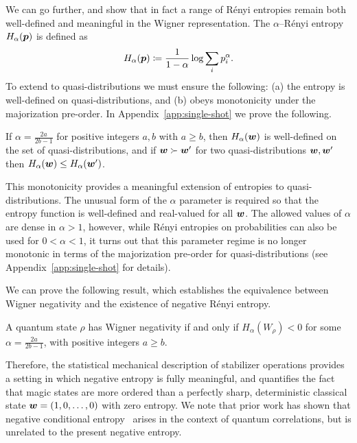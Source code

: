 \documentclass[pra,
aps,
twocolumn,
superscriptaddress,
groupedaddress,
nofootinbib,
reprint
]{revtex4-1}
\begin{document}
We can go further, and show that in fact a range of R\'{e}nyi entropies remain both well-defined and meaningful in the Wigner representation. The $\alpha$--R\'{e}nyi entropy $H_\alpha(\boldsymbol{p})$ is defined as~\cite{renyi_1960}
\begin{equation}
	H_\alpha(\boldsymbol{p}) \coloneqq \frac{1}{1-\alpha} \log \sum_i p_i^\alpha.
\end{equation}
To extend to quasi-distributions we must ensure the following: (a) the entropy is well-defined on quasi-distributions, and (b) obeys monotonicity under the majorization pre-order. In Appendix~\ref{app:single-shot} we prove the following.
\begin{theorem}\label{thm:HSchur} 
	If $\alpha = \frac{2a}{2b-1}$ for positive integers $a,b$ with $a \geq b$, then $H_\alpha(\boldsymbol{w})$ is well-defined on the set of quasi-distributions, and if $\boldsymbol{w} \succ \boldsymbol{w}'$ for two quasi-distributions $\boldsymbol{w}, \boldsymbol{w}'$ then $H_\alpha (\boldsymbol{w}) \leq H_\alpha(\boldsymbol{w}')$.
\end{theorem}
This monotonicity provides a meaningful extension of entropies to quasi-distributions. The unusual form of the $\alpha$ parameter is required so that the entropy function is well-defined and real-valued for all $\boldsymbol{w}$. The allowed values of $\alpha$ are dense in $\alpha >1$, however, while R\'{e}nyi entropies on probabilities can also be used for $0 < \alpha <1$, it turns out that this parameter regime is no longer monotonic in terms of the majorization pre-order for quasi-distributions (see Appendix~\ref{app:single-shot} for details).

We can prove the following result, which establishes the equivalence between Wigner negativity and the existence of negative R\'{e}nyi entropy.
\begin{theorem}\label{thm:Magic}
	A quantum state $\rho$ has Wigner negativity if and only if $H_\alpha(W_\rho) <0$ for some $\alpha =  \frac{2a}{2b-1}$, with positive integers $a \ge b$.
\end{theorem}
Therefore, the statistical mechanical description of stabilizer operations provides a setting in which negative entropy is fully meaningful, and quantifies the fact that magic states are more ordered than a perfectly sharp, deterministic classical state $\boldsymbol{w} = (1,0, \dots , 0)$ with zero entropy. We note that prior work has shown that negative conditional entropy~\cite{rio_thermodynamic_2011} arises in the context of quantum correlations, but is unrelated to the present negative entropy.
\end{document}
